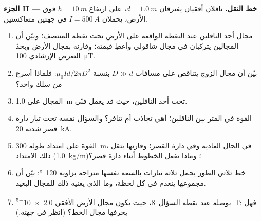 \begin{problem}
\medskip
\noindent\textbf{الجزء II --- خط النقل.}
ناقلان أفقيان يفترقان $d = \qty{1.0}{m}$، على ارتفاع $h = \qty{10}{m}$ فوق
الأرض، يحملان $I = \qty{500}{A}$ في جهتين متعاكستين.
\begin{enumerate}[resume]
  \item مجال أحد الناقلين عند النقطة الواقعة على الأرض تحت
        نقطة المنتصف؛ وبيّن أن المجالين يتركبان في مجال شاقولي
        وأعطِ قيمته؛ وقارنه بمجال الأرض وبحدّ التعرض
        الإرشادي \qty{100}{\micro T}.
  \item بيّن أن مجال الزوج يتناقص على مسافات $D \gg d$ بنسبة
        $\mu_0Id/2\pi D^2$: فلماذا أسرع من سلك واحد؟
  \item المجال على \qty{1.0}{m} تحت أحد الناقلين، حيث قد يعمل
        فنّي.
  \item القوة في المتر بين الناقلين؛ أهي تجاذب أم
        تنافر؟ والسؤال نفسه تحت تيار دارة قصر شدته \qty{20}{kA}.
  \item القوة على امتداد طوله \qty{300}{m}، في الحال العادية وفي دارة القصر؛
        وقارنها بثقل ذلك الامتداد (\qty{1.0}{kg/m})؛ وماذا تفعل الخطوط
        أثناء دارة قصر؟
  \item خط ثلاثي الطور يحمل ثلاثة تيارات بالسعة نفسها
        متزاحة بزاوية \qty{120}{\degree}: بيّن أن مجموعها ينعدم في
        كل لحظة، وما الذي يعنيه ذلك للمجال البعيد.
  \item بوصلة عند نقطة السؤال~8، حيث يكون مجال الأرض
        الأفقي \qty{2.0e-5}{T}: فهل يحرفها مجال الخط؟
        (انظر في جهته.)
\end{enumerate}


\end{problem}

